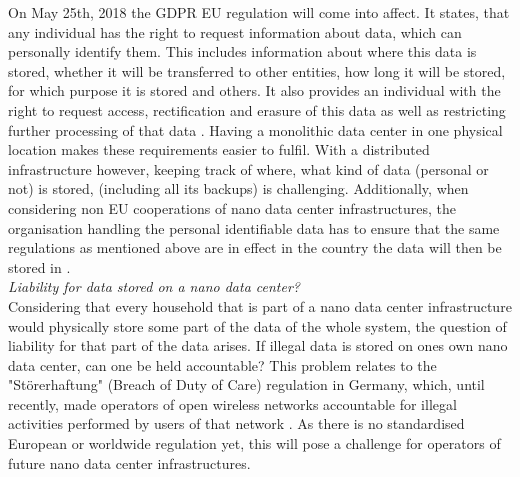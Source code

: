 On May 25th, 2018 the GDPR EU regulation will come into affect. It states, that any individual has the right to request information about data, which can personally identify them. This includes information about where this data is stored, whether it will be transferred to other entities, how long it will be stored, for which purpose it is stored and others. It also provides an individual with the right to request access, rectification and erasure of this data as well as restricting further processing of that data \cite{gdpr3}. Having a monolithic data center in one physical location makes these requirements easier to fulfil. With a distributed infrastructure however, keeping track of where, what kind of data (personal or not) is stored, (including all its backups) is challenging. Additionally, when considering non EU cooperations of nano data center infrastructures, the organisation handling the personal identifiable data has to ensure that the same regulations as mentioned above are in effect in the country the data will then be stored in \cite{gdpr5}.\\

\textit{Liability for data stored on a nano data center?}\\
Considering that every household that is part of a nano data center infrastructure would physically store some part of the data of the whole system, the question of liability for that part of the data arises. If illegal data is stored on ones own nano data center, can one be held accountable? This problem relates to the "Störerhaftung" (Breach of Duty of Care) regulation in Germany, which, until recently, made operators of open wireless networks accountable for illegal activities performed by users of that network \cite{bgb}. As there is no standardised European or worldwide regulation yet, this will pose a challenge for operators of future nano data center infrastructures.
